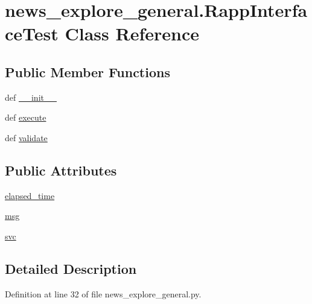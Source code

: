 \hypertarget{classnews__explore__general_1_1RappInterfaceTest}{\section{news\-\_\-explore\-\_\-general.\-Rapp\-Interface\-Test Class Reference}
\label{classnews__explore__general_1_1RappInterfaceTest}
}
\subsection*{Public Member Functions}
\begin{DoxyCompactItemize}
\item 
def \hyperlink{classnews__explore__general_1_1RappInterfaceTest_a726a3f20a91b33c44dfc2e9615a42f21}{\-\_\-\-\_\-init\-\_\-\-\_\-}
\item 
def \hyperlink{classnews__explore__general_1_1RappInterfaceTest_a8bc7eb64d5e477934dc734a709a57622}{execute}
\item 
def \hyperlink{classnews__explore__general_1_1RappInterfaceTest_a3cc3a05798384cedfad0c1d78cde71b9}{validate}
\end{DoxyCompactItemize}
\subsection*{Public Attributes}
\begin{DoxyCompactItemize}
\item 
\hyperlink{classnews__explore__general_1_1RappInterfaceTest_a1aae32a888136b48a1606594e61aef0e}{elapsed\-\_\-time}
\item 
\hyperlink{classnews__explore__general_1_1RappInterfaceTest_ac5157eb3fa2375f76dc1a33ed452284e}{msg}
\item 
\hyperlink{classnews__explore__general_1_1RappInterfaceTest_a27223e0e013957a70c1e6975582c2e89}{svc}
\end{DoxyCompactItemize}


\subsection{Detailed Description}


Definition at line 32 of file news\-\_\-explore\-\_\-general.\-py.



